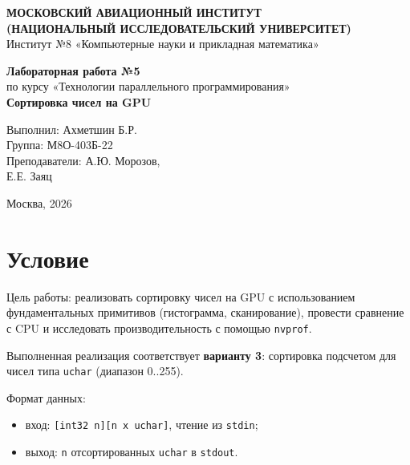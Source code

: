 \documentclass[a4paper,14pt]{extarticle}
\begin{document}
\begin{titlepage}
\begin{center}
\textbf{МОСКОВСКИЙ АВИАЦИОННЫЙ ИНСТИТУТ}\\
\textbf{(НАЦИОНАЛЬНЫЙ ИССЛЕДОВАТЕЛЬСКИЙ УНИВЕРСИТЕТ)}\\
Институт №8 «Компьютерные науки и прикладная математика»
\end{center}

\vspace{3.5cm}
\begin{center}
\textbf{\Large Лабораторная работа №5}\\
\vspace{0.3cm}
по курсу «Технологии параллельного программирования»\\
\vspace{0.8cm}
\textbf{Сортировка чисел на GPU}
\end{center}

\vspace{4cm}
\begin{flushright}
Выполнил: Ахметшин Б.Р.\\
Группа: М8О-403Б-22\\
Преподаватели: А.Ю. Морозов,\\
\hspace*{3.6cm} Е.Е. Заяц
\end{flushright}

\vfill
\begin{center}
Москва, 2026
\end{center}
\end{titlepage}

\section*{Условие}
Цель работы: реализовать сортировку чисел на GPU с использованием
фундаментальных примитивов (гистограмма, сканирование), провести сравнение
с CPU и исследовать производительность с помощью \texttt{nvprof}.

Выполненная реализация соответствует \textbf{варианту 3}:
сортировка подсчетом для чисел типа \texttt{uchar} (диапазон 0..255).

Формат данных:
\begin{itemize}
    \item вход: \texttt{[int32 n][n x uchar]}, чтение из \texttt{stdin};
    \item выход: \texttt{n} отсортированных \texttt{uchar} в \texttt{stdout}.
\end{itemize}
\end{document}
